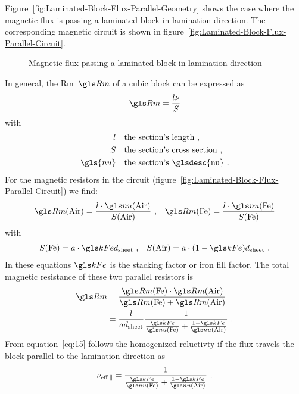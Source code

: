 Figure~\ref{fig:Laminated-Block-Flux-Parallel-Geometry} shows the
case where the magnetic flux is passing a laminated block in
lamination direction.  The corresponding magnetic circuit is shown in
figure~\ref{fig:Laminated-Block-Flux-Parallel-Circuit}.
\begin{figure}
  \centering
  \subfloat[Geometry]{
    
    \label{fig:Laminated-Block-Flux-Parallel-Geometry}
  }
  \hfil
  \caption{Magnetic flux passing a laminated block in lamination direction}
  \label{fig:Lam-Mat-Flux-parallel}
\end{figure}
\label{sec:cart-coord}
In general, the \glsdesc{Rm}~$\Rm$ of a cubic block can be expressed as
\begin{gather}
  \Rm=\frac{l\nu}{S}
\end{gather}
with
\begin{align*}
  l&\quad\text{the section's length}\text{~,}\\
  S&\quad\text{the section's cross section}\text{~,}\\
  \gls{nu}&\quad\text{the section's \glsdesc{nu}}\text{~.}
\end{align*}
 For the magnetic resistors in the circuit
(figure~\ref{fig:Laminated-Block-Flux-Parallel-Circuit}) we find:
\begin{align}
  \RmAir=\frac{l\cdot\nuAir}{\SAir}\text{~,} &&
  \RmFe=\frac{l\cdot\nuFe}{\SFe}
\end{align}
with
\begin{align}
  \SFe=a\cdot \kFe \dsheet\text{~,} &&
  \SAir=a\cdot (1-\kFe) \dsheet\text{~.}
\end{align}
In these equations $\kFe$ is the stacking factor or iron fill factor.
The total magnetic resistance of these two parallel resistors is
\begin{gather}
  \label{eq:15}
\begin{split}
  \Rm&=\frac{\RmFe\cdot\RmAir}{\RmFe + \RmAir} \\
  &=\frac{l}{a\dsheet}
    \frac{1}{\frac{\kFe}{\nuFe}+\frac{1-\kFe}{\nuAir}}\text{~.}
\end{split}
\end{gather}
From equation~\eqref{eq:15} follows the homogenized reluctivty if the
flux travels the block parallel to the lamination direction as
\begin{gather}
  \nueffpar=\frac{1}{\frac{\kFe}{\nuFe}+\frac{1-\kFe}{\nuAir}}\text{~.}
\end{gather}


